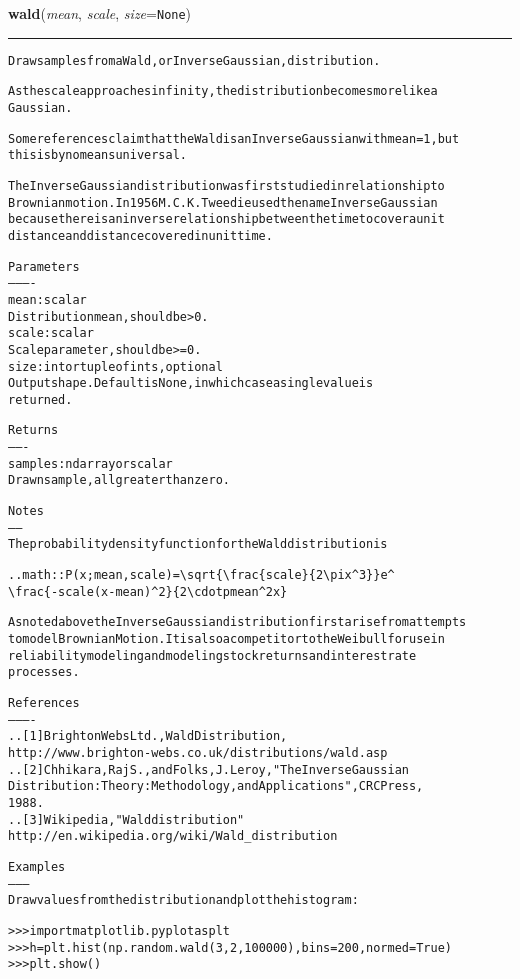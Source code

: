 \hspace{.8\funcindent}\begin{boxedminipage}{\funcwidth}

    \raggedright \textbf{wald}(\textit{mean}, \textit{scale}, \textit{size}={\tt None})

    \vspace{-1.5ex}

    \rule{\textwidth}{0.5\fboxrule}
\setlength{\parskip}{2ex}
\begin{alltt}
Draw samples from a Wald, or Inverse Gaussian, distribution.

As the scale approaches infinity, the distribution becomes more like a
Gaussian.

Some references claim that the Wald is an Inverse Gaussian with mean=1, but
this is by no means universal.

The Inverse Gaussian distribution was first studied in relationship to
Brownian motion. In 1956 M.C.K. Tweedie used the name Inverse Gaussian
because there is an inverse relationship between the time to cover a unit
distance and distance covered in unit time.

Parameters
----------
mean : scalar
    Distribution mean, should be {\textgreater} 0.
scale : scalar
    Scale parameter, should be {\textgreater}= 0.
size : int or tuple of ints, optional
    Output shape. Default is None, in which case a single value is
    returned.

Returns
-------
samples : ndarray or scalar
    Drawn sample, all greater than zero.

Notes
-----
The probability density function for the Wald distribution is

.. math:: P(x;mean,scale) = {\textbackslash}sqrt\{{\textbackslash}frac\{scale\}\{2{\textbackslash}pi x{\textasciicircum}3\}\}e{\textasciicircum}
                            {\textbackslash}frac\{-scale(x-mean){\textasciicircum}2\}\{2{\textbackslash}cdotp mean{\textasciicircum}2x\}

As noted above the Inverse Gaussian distribution first arise from attempts
to model Brownian Motion. It is also a competitor to the Weibull for use in
reliability modeling and modeling stock returns and interest rate
processes.

References
----------
..[1] Brighton Webs Ltd., Wald Distribution,
      http://www.brighton-webs.co.uk/distributions/wald.asp
..[2] Chhikara, Raj S., and Folks, J. Leroy, "The Inverse Gaussian
      Distribution: Theory : Methodology, and Applications", CRC Press,
      1988.
..[3] Wikipedia, "Wald distribution"
      http://en.wikipedia.org/wiki/Wald\_distribution

Examples
--------
Draw values from the distribution and plot the histogram:

{\textgreater}{\textgreater}{\textgreater} import matplotlib.pyplot as plt
{\textgreater}{\textgreater}{\textgreater} h = plt.hist(np.random.wald(3, 2, 100000), bins=200, normed=True)
{\textgreater}{\textgreater}{\textgreater} plt.show()
\end{alltt}

\setlength{\parskip}{1ex}
    \end{boxedminipage}

